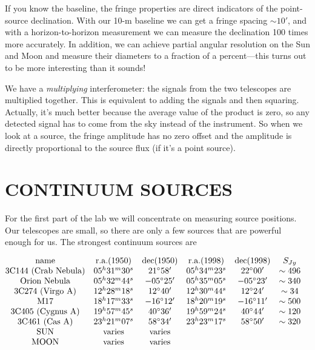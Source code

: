 \documentclass[11pt,preprint]{aastex}
\begin{document}
 If you know the baseline, the fringe properties are direct indicators
of the point-source declination.  With our 10-m baseline we can get a
fringe spacing $\sim 10'$, and with a horizon-to-horizon measurement we
can measure the declination 100 times more accurately.  In addition, we
can achieve partial angular resolution on the Sun and Moon and measure
their diameters to a fraction of a percent---this turns out to be more
interesting than it sounds!

We have a {\it multiplying} interferometer: the signals from the
two telescopes are multiplied together. This is equivalent to adding the
signals and then squaring. Actually, it's much better because the
average value of the product is zero, so any detected signal has to come
from the sky instead of the instrument.  So when we look at a source, the
fringe amplitude has no zero offset and the amplitude is directly
proportional to the source flux (if it's a point source). 


\section {CONTINUUM SOURCES}

	For the first part of the lab we will concentrate on measuring
source positions. Our telescopes are small, so there are only a few
sources that are powerful enough for us. The strongest continuum sources
are

$$\vbox{\halign{ \hfil#\hfil\ \ & \hfil#\hfil\ \ & \hfil#\hfil\ \ &    
\hfil#\hfil\ \ & \hfil#\hfil\ \ & \hfil#\hfil\ \ \cr

name & r.a.(1950) & dec(1950) & r.a.(1998) & dec(1998) & $S_{Jy}$ \cr

3C144 (Crab Nebula) & $05^h31^m30^s$ & $21^\circ 58'$
                    & $05^h34^m23^s$ & $22^\circ 00'$ & $\sim 496$ \cr
Orion Nebula        & $05^h32^m44^s$ & $-05^\circ 25'$
                    & $05^h35^m05^s$ & $-05^\circ 23'$ & $\sim 340$ \cr
3C274 (Virgo A)     & $12^h28^m18^s$ & $12^\circ 40'$
                    & $12^h30^m44^s$ & $12^\circ 24'$ & $\sim 34$ \cr
M17                 & $18^h17^m33^s$ & $-16^\circ 12'$
                    & $18^h20^m19^s$ & $-16^\circ 11'$ & $\sim 500$ \cr
3C405 (Cygnus A)    & $19^h57^m45^s$ & $40^\circ 36'$
                    & $19^h59^m24^s$ & $40^\circ 44'$ & $\sim 120$ \cr  
3C461 (Cas A)       & $23^h21^m07^s$ & $58^\circ 34'$
                    & $23^h23^m17^s$ & $58^\circ 50'$ & $\sim 320$ \cr 
SUN                 &   varies       &   varies \cr
MOON                &   varies       &   varies \cr
\cr
}}$$
\end{document}
